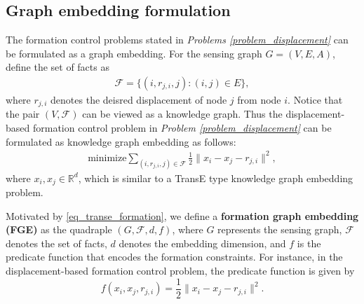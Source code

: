 \documentclass{ifacconf}
\begin{document}
\subsection{Graph embedding formulation}
The formation control problems stated in \textit{Problems \ref{problem_displacement}} can be formulated as a graph embedding. 
For the sensing graph $G = (V,E,A)$, define the set of facts as
\begin{align*}
\mathcal{F} = \{(i,r_{j,i},j) : (i,j) \in E\},
\end{align*}
where $r_{j,i}$ denotes the deisred displacement of node $j$ from node $i$.
Notice that the pair $(V, \mathcal{F})$ can be viewed as a knowledge graph. Thus the displacement-based formation control problem in \textit{Problem \ref{problem_displacement}} can be formulated as knowledge graph embedding as follows:
\begin{align} \label{eq_transe_formation}
\textrm{minimize} \sum_{(i,r_{j,i},j) \in \mathcal{F}} \frac{1}{2} \| x_i - x_j - {r_{j,i}} \|^2,
\end{align}
where $x_i, x_j \in \mathbb{R}^d$, which is similar to a TransE type knowledge graph embedding problem. %


Motivated by \eqref{eq_transe_formation}, 
we define a \textbf{formation graph embedding (FGE)} as the quadraple $(G,\mathcal{F},d,f)$, where $G$ represents the sensing graph, $\mathcal{F}$ denotes the set of facts, $d$ denotes the embedding dimension, and $f$ is the predicate function that encodes the formation constraints. For instance, in the displacement-based formation control problem, the predicate function is given by 
$$f(x_i,x_j,r_{j,i}) = \frac{1}{2}\| x_i-x_j-r_{j,i} \|^2.$$
\end{document}
